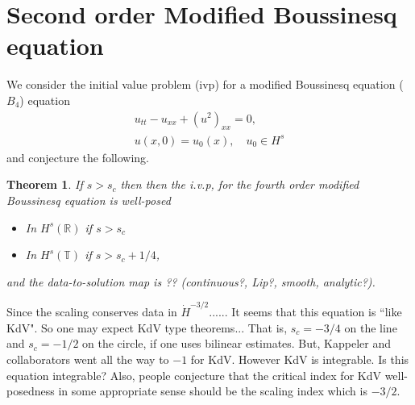 \documentclass[12pt,reqno]{amsart}
\numberwithin{equation}{section}  %
\numberwithin{figure}{section}
\newcommand{\rr}{\mathbb{R}}
\newcommand{\ci}{\mathbb{T}}
\theoremstyle{plain}
\newtheorem{theorem}{Theorem}
\theoremstyle{definition}
\theoremstyle{remark}
\begin{document}
%

\section{Second order Modified Boussinesq  equation}
\label{sec:intro}
We consider the initial value problem (ivp) for a modified Boussinesq
equation ($B_4$) equation 
\begin{gather}
  u_{tt} - u_{xx} + (u^2)_{xx} = 0,
  \label{eqn:mb}
  \\
  u(x,0) = u_{0}(x), \quad u_{0} \in H^{s}
  \label{eqn:mb-init-data}
\end{gather}
and conjecture the following.
%
%
%
%
%
%
%
%
\begin{theorem}
  If $s>s_c$ then then the  i.v.p, for the fourth order modified
  Boussinesq  equation is well-posed
  \begin{itemize}
    \item In $H^s(\rr)$ if $s > s_c$
    \item In $H^{s}(\ci)$ if $s > s_c + 1/4$,
  \end{itemize}
  and the data-to-solution map is  ?? (continuous?, Lip?, smooth, analytic?). 
  \label{thm:wp}
\end{theorem}
%
%
%
%
%
Since the scaling conserves data in $\dot{H}^{-3/2}$......
It seems that this equation is ``like KdV".
So one may expect KdV type theorems...
That is, $s_c=-3/4$ on the line and $s_c=-1/2$ on the circle,
if one uses bilinear estimates.
But, Kappeler and collaborators went all the way to $-1$ for KdV.
However KdV is integrable. Is this equation integrable?
Also, people conjecture that the critical index for KdV well-posedness 
in some appropriate sense should be the scaling index which is  $-3/2$.
\end{document}
